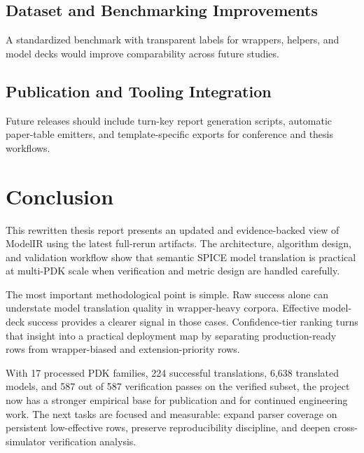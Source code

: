 \documentclass[12pt,a4paper,oneside]{report}
\begin{document}
\section{Dataset and Benchmarking Improvements}
A standardized benchmark with transparent labels for wrappers, helpers, and model decks would improve comparability across future studies.

\section{Publication and Tooling Integration}
Future releases should include turn-key report generation scripts, automatic paper-table emitters, and template-specific exports for conference and thesis workflows.

\chapter{Conclusion}

This rewritten thesis report presents an updated and evidence-backed view of ModelIR using the latest full-rerun artifacts. The architecture, algorithm design, and validation workflow show that semantic SPICE model translation is practical at multi-PDK scale when verification and metric design are handled carefully.

The most important methodological point is simple. Raw success alone can understate model translation quality in wrapper-heavy corpora. Effective model-deck success provides a clearer signal in those cases. Confidence-tier ranking turns that insight into a practical deployment map by separating production-ready rows from wrapper-biased and extension-priority rows.

With 17 processed PDK families, 224 successful translations, 6,638 translated models, and 587 out of 587 verification passes on the verified subset, the project now has a stronger empirical base for publication and for continued engineering work. The next tasks are focused and measurable: expand parser coverage on persistent low-effective rows, preserve reproducibility discipline, and deepen cross-simulator verification analysis.

\appendix
\end{document}
